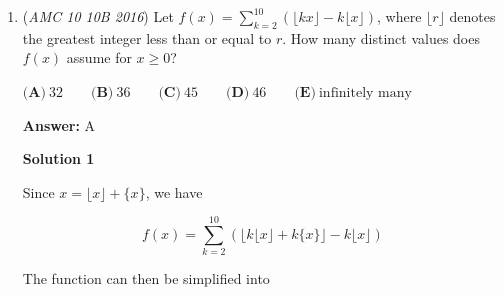 \begin{enumerate}
Looking at the answer options, all the numbers are pretty small so it is easy to make a list. 

 $12|23|34 \rightarrow 1234$
$13|35|57 \rightarrow 1357$
$14|48|82 \rightarrow 1482$
$23|34|45 \rightarrow 2345$
$24|46|68 \rightarrow 2468$
$24|47|70 \rightarrow 2470$
$25|59|93 \rightarrow 2593$
$34|45|56 \rightarrow 3456$
$35|57|79 \rightarrow 3579$
$35|58|81 \rightarrow 3581$
$45|56|67 \rightarrow 4567$
$46|69|92 \rightarrow 4692$
$56|67|78 \rightarrow 5678$
$56|68|80 \rightarrow 5680$
$67|78|89 \rightarrow 6789$
$67|79|91 \rightarrow 6791$
$88|89|90 \rightarrow 8890$

 Counting all the cases we get our answer of $17$ which is $\boxed{D}$-srisainandan6

 



\textbf{Solution 3}

Let $x$ be the difference between the numbers $ab$, $bc$, and $cd$. We then have 
 \[10a + b = 10b + c - x\] and
 \[10b + c = 10c + d - x.\]

 Subtracting the second equation from the first and then simplifying, we are left with:
 \[10a + 8c + d = 19b.\]

 Notice that $b > c$. Because the values of $a$ and $d$ are irrelevant compared to the other numbers, we can just find pairs of $(b, c)$ such that $a > 0$. Trying out each value of $b$ from $2$ to $9$ and summing the number of pairs yields $1 + 2 + 4 + 4 + 3 + 2 + 1 + 0 = \boxed{\textbf{(D) }17}$

 - cappucher

 


	\item (\textit{AMC 10 10B 2016}) Let $f(x)=\sum_{k=2}^{10}(\lfloor kx \rfloor -k \lfloor x \rfloor)$, where $\lfloor r \rfloor$ denotes the greatest integer less than or equal to $r$. How many distinct values does $f(x)$ assume for $x \ge 0$?


 $\textbf{(A)}\ 32\qquad\textbf{(B)}\ 36\qquad\textbf{(C)}\ 45\qquad\textbf{(D)}\ 46\qquad\textbf{(E)}\ \text{infinitely many}$

 \textbf{Answer: }A



\textbf{Solution 1}

Since $x = \lfloor x \rfloor + \{ x \}$, we have 

 
 \[f(x) = \sum_{k=2}^{10} (\lfloor k \lfloor x \rfloor +k \{ x \} \rfloor - k \lfloor x \rfloor)\]

 The function can then be simplified into 


\end{enumerate}
